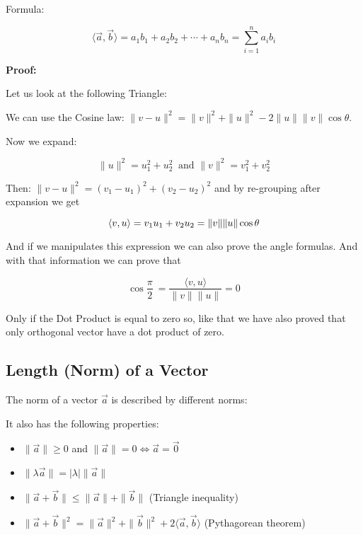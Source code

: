 Formula:

\[
	\langle\vec{a}, \vec{b}\rangle = a_1 b_1 + a_2 b_2 + \cdots + a_n b_n = \sum_{i = 1}^{n} a_i b_i
\]

\textbf{Proof:}

Let us look at the following Triangle:

\begin{center}
\end{center}

We can use the Cosine law: \(\|v - u\|^{2} = \|v\|^2 + \|u\|^2  - 2 \|u\| \|v\| \cos\theta\).
\vspace{\baselineskip}

Now we expand:

\[
	\|u\|^2 = u_{1}^2 + u_{2}^2\ \text{ and } \|v\|^2 = v_{1}^2 + v_{2}^2
\]

Then: \(\|v - u\|^2 = {(v_1 - u_1)}^2 + {(v_2 - u_2)}^2\) and by re-grouping after expansion we get

\[
	\langle v, u\rangle = v_1u_1 + v_2u_2 = \|v\|\|u\|\cos \theta \\ 
\]

\QED

And if we manipulates this expression we can also prove the angle formulas.
And with that information we can prove that

\[
	\cos \frac{\pi}{2}\ = \frac{\langle v, u\rangle}{\|v\|\|u\|} = 0
\]

Only if the Dot Product is equal to zero so, like that we have also proved that
only orthogonal vector have a dot product of zero.

\subsection{Length (Norm) of a Vector}

The norm of a vector \(\vec{a}\) is described by different norms:

It also has the following properties:

\begin{itemize}
	\item \(\|\vec{a}\| \geq 0\) and \(\|\vec{a}\| = 0 \Leftrightarrow \vec{a} = \vec{0}\)
	\item \(\|\lambda \vec{a}\| = |\lambda| \|\vec{a}\|\)
	\item \(\|\vec{a} + \vec{b}\| \leq \|\vec{a}\| + \|\vec{b}\|\) (Triangle inequality)
	\item \(\|\vec{a} + \vec{b}\|^2 = \|\vec{a}\|^2 + \|\vec{b}\|^2 + 2\langle\vec{a}, \vec{b}\rangle\) (Pythagorean theorem)
\end{itemize}

